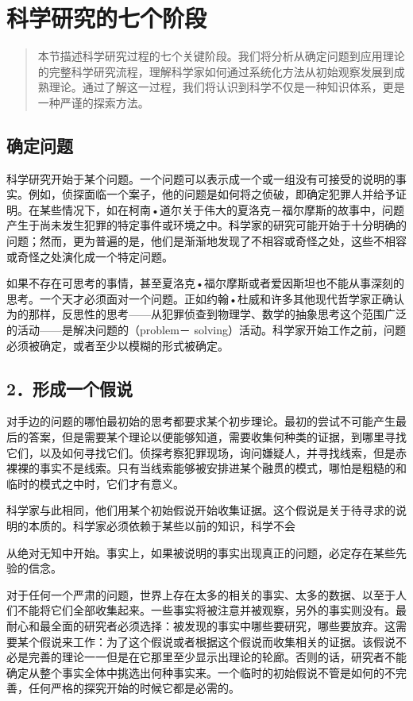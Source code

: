 \section{科学研究的七个阶段}

\begin{quotation}
本节描述科学研究过程的七个关键阶段。我们将分析从确定问题到应用理论的完整科学研究流程，理解科学家如何通过系统化方法从初始观察发展到成熟理论。通过了解这一过程，我们将认识到科学不仅是一种知识体系，更是一种严谨的探索方法。
\end{quotation}

\subsection{确定问题}
科学研究开始于某个问题。一个问题可以表示成一个或一组没有可接受的说明的事实。例如，侦探面临一个案子，他的问题是如何将之侦破，即确定犯罪人并给予证明。在某些情况下，如在柯南•道尔关于伟大的夏洛克－福尔摩斯的故事中，问题产生于尚未发生犯罪的特定事件或环境之中。科学家的研究可能开始于十分明确的问题；然而，更为普遍的是，他们是渐渐地发现了不相容或奇怪之处，这些不相容或奇怪之处演化成一个特定问题。

如果不存在可思考的事情，甚至夏洛克•福尔摩斯或者爱因斯坦也不能从事深刻的思考。一个天才必须面对一个问题。正如约翰•杜威和许多其他现代哲学家正确认为的那样，反思性的思考——从犯罪侦查到物理学、数学的抽象思考这个范围广泛的活动——是解决问题的（problem－ solving）活动。科学家开始工作之前，问题必须被确定，或者至少以模糊的形式被确定。

\subsection{2．形成一个假说}
对手边的问题的哪怕最初始的思考都要求某个初步理论。最初的尝试不可能产生最后的答案，但是需要某个理论以便能够知道，需要收集何种类的证据，到哪里寻找它们，以及如何寻找它们。侦探考察犯罪现场，询问嫌疑人，并寻找线索，但是赤裸裸的事实不是线索。只有当线索能够被安排进某个融贯的模式，哪怕是粗糙的和临时的模式之中时，它们才有意义。

科学家与此相同，他们用某个初始假说开始收集证据。这个假说是关于待寻求的说明的本质的。科学家必须依赖于某些以前的知识，科学不会

从绝对无知中开始。事实上，如果被说明的事实出现真正的问题，必定存在某些先验的信念。

对于任何一个严肃的问题，世界上存在太多的相关的事实、太多的数据、以至于人们不能将它们全部收集起来。一些事实将被注意并被观察，另外的事实则没有。最耐心和最全面的研究者必须选择：被发现的事实中哪些要研究，哪些要放弃。这需要某个假说来工作：为了这个假说或者根据这个假说而收集相关的证据。该假说不必是完善的理论一一但是在它那里至少显示出理论的轮廊。否则的话，研究者不能确定从整个事实全体中挑选出何种事实来。一个临时的初始假说不管是如何的不完善，任何严格的探究开始的时候它都是必需的。

